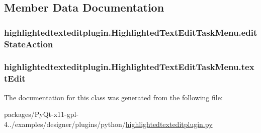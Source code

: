 \subsection{Member Data Documentation}
\hypertarget{classhighlightedtexteditplugin_1_1HighlightedTextEditTaskMenu_a5e6eafe31ab1adb066a3f7e91f2e2efa}{}
\subsubsection[{edit\+State\+Action}]{\setlength{\rightskip}{0pt plus 5cm}highlightedtexteditplugin.\+Highlighted\+Text\+Edit\+Task\+Menu.\+edit\+State\+Action}\label{classhighlightedtexteditplugin_1_1HighlightedTextEditTaskMenu_a5e6eafe31ab1adb066a3f7e91f2e2efa}
\hypertarget{classhighlightedtexteditplugin_1_1HighlightedTextEditTaskMenu_a744e097b876735070861bab085ccb1cf}{}
\subsubsection[{text\+Edit}]{\setlength{\rightskip}{0pt plus 5cm}highlightedtexteditplugin.\+Highlighted\+Text\+Edit\+Task\+Menu.\+text\+Edit}\label{classhighlightedtexteditplugin_1_1HighlightedTextEditTaskMenu_a744e097b876735070861bab085ccb1cf}


The documentation for this class was generated from the following file\+:\begin{DoxyCompactItemize}
\item 
packages/\+Py\+Qt-\/x11-\/gpl-\/4../examples/designer/plugins/python/\hyperlink{highlightedtexteditplugin_8py}{highlightedtexteditplugin.\+py}\end{DoxyCompactItemize}
